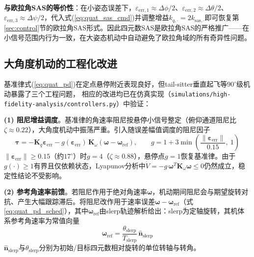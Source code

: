 \textbf{与欧拉角SAS的等价性}：在小姿态误差下，$\varepsilon_{\text{err},1} \approx \Delta\phi/2$、$\varepsilon_{\text{err},2} \approx \Delta\theta/2$、$\varepsilon_{\text{err},3} \approx \Delta\psi/2$，代入式(\ref{eq:quat_sas_cmd})并调整增益$k_{q,\cdot} = 2k_{\text{sas},\cdot}$即可恢复第\ref{sec:control}节的欧拉角SAS形式。因此四元数SAS是欧拉角SAS的严格推广——在小信号范围内行为一致，在大姿态机动中自动避免了欧拉角域的所有奇异性问题。

\subsection{大角度机动的工程化改进}
\label{sec:quat_sas_engineering}

基准律式(\ref{eq:quat_pd})在定点悬停附近表现良好，但tail-sitter垂直起飞等$90^\circ$级机动暴露了三个工程问题，
相应的改进均已在仿真实现（\texttt{simulations/}\allowbreak\texttt{high-fidelity-analysis/}\allowbreak\texttt{controllers.py}）中验证：

\textbf{(1) 阻尼增益调度}。基准律的角速率阻尼按悬停小信号整定（俯仰通道阻尼比$\zeta\approx0.22$），大角度机动中振荡严重。引入随误差幅值调度的阻尼因子
\begin{equation}
    \boldsymbol{\tau} = -\mathbf{K}_q\boldsymbol{\varepsilon}_{\text{err}} - g(\boldsymbol{\varepsilon}_{\text{err}})\,\mathbf{K}_\omega\left(\boldsymbol{\omega} - \boldsymbol{\omega}_{\text{ref}}\right),
    \qquad
    g = 1 + 3\min\!\left(\frac{\|\boldsymbol{\varepsilon}_{\text{err}}\|}{0.15},\ 1\right)
    \label{eq:quat_pd_sched}
\end{equation}
$\|\boldsymbol{\varepsilon}_{\text{err}}\|\geq0.15$（约$17^\circ$）时$g=4$（$\zeta\approx0.88$），悬停点$g=1$恢复基准律。由于$g(\cdot)\geq1$有界且仅依赖状态，Lyapunov分析中$\dot{V}=-g\,\boldsymbol{\omega}^T\mathbf{K}_\omega\boldsymbol{\omega}\leq0$仍然成立，稳定性结论不受影响。

\textbf{(2) 参考角速率前馈}。若阻尼作用于绝对角速率$\boldsymbol{\omega}$，机动期间阻尼会与期望旋转对抗、产生大幅跟踪滞后。将阻尼改作用于速率误差$\boldsymbol{\omega}-\boldsymbol{\omega}_{\text{ref}}$（式\ref{eq:quat_pd_sched}），其中$\boldsymbol{\omega}_{\text{ref}}$由slerp轨迹解析给出：slerp为定轴旋转，其机体系参考角速率为常值向量
\begin{equation}
    \boldsymbol{\omega}_{\text{ref}} = \frac{\theta_{\text{slerp}}}{T_{\text{slerp}}}\,\hat{\mathbf{n}}_{\text{slerp}}
    \label{eq:omega_ref_slerp}
\end{equation}
$\hat{\mathbf{n}}_{\text{slerp}}$与$\theta_{\text{slerp}}$分别为初始/目标四元数相对旋转的单位转轴与转角。

